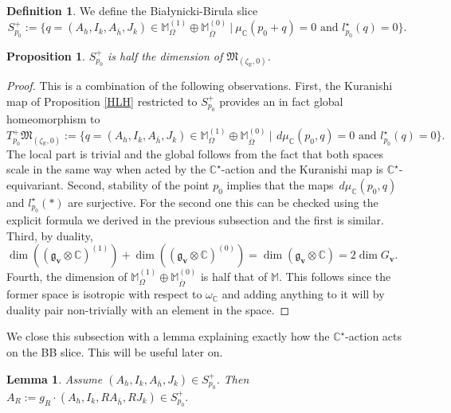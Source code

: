 \documentclass[12pt,oneside,reqno]{amsart}
\newtheorem{proposition}[theorem]{Proposition}
\newtheorem{lemma}[theorem]{Lemma}
\theoremstyle{definition}
\newtheorem{definition}[theorem]{Definition}
\numberwithin{equation}{section}
\numberwithin{theorem}{section}
\newcommand{\R}{\mathbb{R}}
\newcommand{\C}{\mathbb{C}}
\renewcommand{\dim}{\operatorname{dim}}
\begin{document}
%
\begin{definition}
We define the Bia\l{}ynicki-Birula slice 
%
\begin{equation}
S^+_{p_0}:= \{ q= (A_h,I_k,A_{\bar h},J_k)\in \mathbb M_{\Omega}^{(1)}\oplus \mathbb M_{\overline{\Omega}}^{(0)}~|~\mu_{\C}(p_0+q) =0 \text{ and } l^{\star}_{p_0}(q) = 0\}.
\end{equation}
%
\end{definition}
%

%
\begin{proposition}
$S^+_{p_0}$ is half the dimension of $\mathfrak M_{(\zeta_{\R},0)}$. 
\end{proposition}
%

%
\begin{proof}
This is a combination of the following observations. First, the Kuranishi map of Proposition \ref{HLH} restricted to $S^+_{p_0}$ provides an in fact global homeomorphism to 
%
\begin{equation}
T_{p_0}^+\mathfrak M_{(\zeta_{\R},0)} := \{ q= (A_h,I_k,A_{\bar h},J_k)\in \mathbb M_{\Omega}^{(1)}\oplus \mathbb M_{\overline{\Omega}}^{(0)}~|~\,d\mu_{\C}(p_0,q) =0 \text{ and } l^{\star}_{p_0}(q) = 0\}.
\end{equation}
%
The local part is trivial and the global follows from the fact that both spaces scale in the same way when acted by the $\C^{\star}$-action and the Kuranishi map is $\C^{\star}$-equivariant.  Second, stability of the point $p_0$ implies that the maps $\,d\mu_{\C}(p_0,q)$ and $l^{\star}_{p_0}(*)$ are surjective. For the second one this can be checked using the explicit formula we derived in the previous subsection and the first is similar. Third, by duality, $\dim((\mathfrak g_{\mathbf{v}}\otimes\C)^{(1)}) + \dim((\mathfrak g_{\mathbf{v}}\otimes\C)^{(0)}) = \dim(\mathfrak g_{\mathbf{v}}\otimes\C) = 2\dim G_{\mathbf{v}}$. Fourth, the dimension of $\mathbb M_{\Omega}^{(1)}\oplus \mathbb M_{\overline{\Omega}}^{(0)}$ is half that of $\mathbb M$. This follows since the former space is isotropic with respect to $\omega_{\C}$ and adding anything to it will by duality pair non-trivially with an element in the space.
\end{proof}
%
We close this subsection with a lemma explaining exactly how the $\C^{\star}$-action acts on the BB slice. This will be useful later on. 
%
\begin{lemma}
    Assume $(A_h,I_k,A_{\bar h},J_k) \in S_{p_0}^+$. Then $A_R:=g_R\cdot(A_h,I_k,RA_{\bar h},RJ_k) \in S_{p_0}^+.$
\end{lemma}
%
\end{document}
